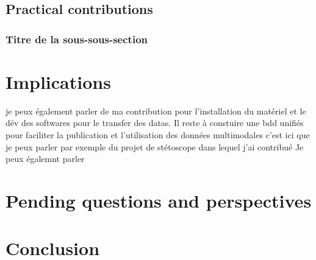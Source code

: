 \subsection{Practical contributions}

\subsubsection{Titre de la sous-sous-section}

\section{Implications}

je peux également parler de ma contribution pour l'installation du matériel et le dév des softwares pour le transfer des datas. 
Il reste à constuire une bdd unifiés pour faciliter la publication et l'utilisation des données multimodales
c'est ici que je peux parler par exemple du projet de stétoscope dans lequel j'ai contribué
Je peux égalemnt parler

\section{Pending questions and perspectives}




\section{Conclusion}



\newpage\thispagestyle{empty}